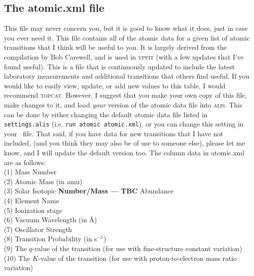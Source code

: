 \begin{center}
\begin{longtable}{p{1.5cm}p{2.5cm}p{2.0cm}p{2.0cm}p{5.0cm}}





\end{longtable}
\end{center}

\subsection{The atomic.xml file}

This file may never concern you, but it is good to know what it
does, just in case you ever need it. This file contains all of the
atomic data for a given list of atomic transitions that I think will
be useful to you. It is largely derived from the compilation by
Bob Carswell, and is used in \textsc{vpfit} (with a few updates
that I've found useful). This is a file that is continuously updated
to include the latest laboratory measurements and additional
transitions that others find useful. If you would like to easily view,
update, or add new values to this table, I would recommend
\textsc{topcat}. However, I suggest that you make your own
copy of this file, make changes to it, and load \textit{your}
version of the atomic data file into \textsc{alis}. This can be
done by either changing the default atomic data file listed
in \texttt{settings.alis} (i.e. \texttt{run atomic atomic.xml}), or
you can change this setting in your \dmod\ file. That said, if
you have data for new transitions that I have not included,
(and you think they may also be of use to someone else),
please let me know, and I will update the default version too.
The column data in atomic.xml are as follows:\\

\indent (1) Mass Number\\
\indent (2) Atomic Mass (in amu)\\
\indent (3) Solar Isotopic \textbf{Number/Mass --- TBC} Abundance\\
\indent (4) Element Name\\
\indent (5) Ionization stage\\
\indent (6) Vacuum Wavelength (in \AA)\\
\indent (7) Oscillator Strength\\
\indent (8) Transition Probability (in s$^{-1}$)\\
\indent (9) The $q$-value of the transition (for use with fine-structure constant variation)\\
\indent (10) The $K$-value of the transition (for use with proton-to-electron mass ratio variation)\\

